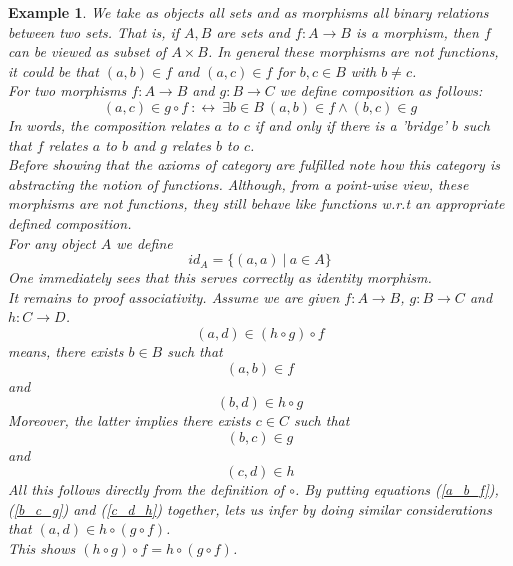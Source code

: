 \documentclass[17pt]{extarticle}
\newtheorem{example}{Example}
\begin{document}
	

\begin{example}
	We take as objects all sets and as morphisms all binary relations between two sets. That is, if $A, B$ are sets and $f:A\rightarrow B$ is a morphism, then $f$ can be viewed as subset of $A\times B$. In general these morphisms are not functions, it could be that $(a,b)\in f$ and $(a, c)\in f$ for $b,c\in B$ with $b\neq c$.\\
	For two morphisms $f:A\rightarrow B$ and $g:B\rightarrow C$ we define composition as follows:
	$$
	(a,c)\in g\circ f \ :\leftrightarrow \ \exists b\in B \ (a,b)\in f \wedge (b,c)\in g 
	$$
	In words, the composition relates $a$ to $c$ if and only if there is a 'bridge' $b$ such that $f$ relates $a$ to $b$ and $g$ relates $b$ to $c$.\\
	Before showing that the axioms of category are fulfilled note how this category is abstracting the notion of functions. Although, from a point-wise view, these morphisms are not functions, they still behave like functions w.r.t an appropriate defined composition.\\
    For any object $A$ we define
    $$id_A =\{(a,a) \ | \ a\in A\}$$
    One immediately sees that this serves correctly as identity morphism.\\
    It remains to proof associativity. Assume we are given $f:A\rightarrow B$, $g:B\rightarrow C$ and $h:C\rightarrow D$.
    $$
    (a,d)\in (h\circ g)\circ f
    $$
    means, there exists $b\in B$ such that
    \begin{equation} \label{a_b_f}
    (a,b)\in f
    \end{equation}
    and
    $$(b,d)\in h\circ g$$
    Moreover, the latter implies there exists $c\in C$ such that
    \begin{equation} \label{b_c_g}
    (b,c)\in g
    \end{equation}
    and
    \begin{equation} \label{c_d_h}
    (c,d)\in h
    \end{equation}
    All this follows directly from the definition of $\circ$.
    By putting equations (\ref{a_b_f}), (\ref{b_c_g}) and (\ref{c_d_h}) together, lets us infer by doing 
    similar considerations that $(a,d)\in h\circ (g\circ f)$.\\
    This shows $(h\circ g)\circ f=h\circ (g\circ f)$.    
\end{example}
\end{document}
